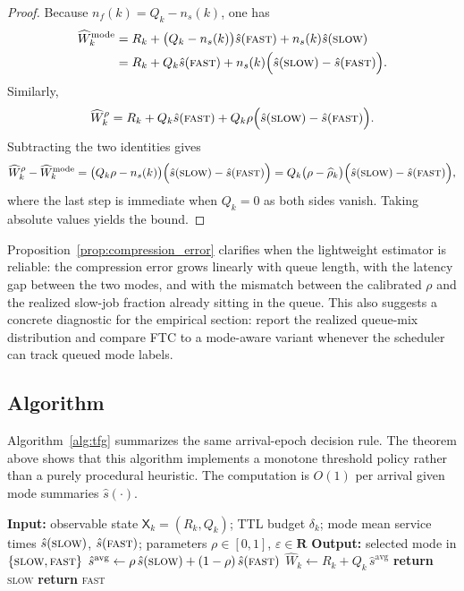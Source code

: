\documentclass[preprint,12pt]{elsarticle}
\begin{document}
\begin{proof}
Because $n_f(k)=Q_k-n_s(k)$, one has
\begin{align*}
\widehat W_k^{\mathrm{mode}}
&= R_k + \bigl(Q_k-n_s(k)\bigr)\hat{s}(\textsc{fast}) + n_s(k)\hat{s}(\textsc{slow}) \\
&= R_k + Q_k\hat{s}(\textsc{fast}) + n_s(k)\Bigl(\hat{s}(\textsc{slow})-\hat{s}(\textsc{fast})\Bigr).
\end{align*}
Similarly,
\[
\widehat W_k^{\rho}
= R_k + Q_k\hat{s}(\textsc{fast}) + Q_k\rho\Bigl(\hat{s}(\textsc{slow})-\hat{s}(\textsc{fast})\Bigr).
\]
Subtracting the two identities gives
\[
\widehat W_k^{\rho} - \widehat W_k^{\mathrm{mode}}
= \bigl(Q_k\rho - n_s(k)\bigr)\Bigl(\hat{s}(\textsc{slow})-\hat{s}(\textsc{fast})\Bigr)
= Q_k\bigl(\rho-\widehat\rho_k\bigr)\Bigl(\hat{s}(\textsc{slow})-\hat{s}(\textsc{fast})\Bigr),
\]
where the last step is immediate when $Q_k=0$ as both sides vanish. Taking absolute values yields the bound.
\end{proof}

Proposition~\ref{prop:compression_error} clarifies when the lightweight estimator is reliable: the compression error grows linearly with queue length, with the latency gap between the two modes, and with the mismatch between the calibrated $\rho$ and the realized slow-job fraction already sitting in the queue. This also suggests a concrete diagnostic for the empirical section: report the realized queue-mix distribution and compare FTC to a mode-aware variant whenever the scheduler can track queued mode labels.

\subsection{Algorithm}
\label{sec:tfg_algorithm}

Algorithm~\ref{alg:tfg} summarizes the same arrival-epoch decision rule. The theorem above shows that this algorithm implements a monotone threshold policy rather than a purely procedural heuristic. The computation is $O(1)$ per arrival given mode summaries $\hat{s}(\cdot)$.

\begin{algorithm}[t]
\caption{FTC (Firm-Deadline Tool Control) at request arrival (defaults: $\rho=0.55$, $\varepsilon=0$).}
\label{alg:tfg}
\begin{algorithmic}[1]
\STATE \textbf{Input:} observable state $\mathsf{X}_k=(R_k,Q_k)$; TTL budget $\delta_k$; mode mean service times $\hat{s}(\textsc{slow})$, $\hat{s}(\textsc{fast})$; parameters $\rho\in[0,1]$, $\varepsilon\in \mathbf{R}$
\STATE \textbf{Output:} selected mode in $\{\textsc{slow},\textsc{fast}\}$
\STATE $\hat{s}^{\mathrm{avg}} \gets \rho\,\hat{s}(\textsc{slow}) + (1-\rho)\,\hat{s}(\textsc{fast})$
\STATE $\widehat{W}_k \gets R_k + Q_k\,\hat{s}^{\mathrm{avg}}$
    \STATE \textbf{return} \textsc{slow}
\ELSE
    \STATE \textbf{return} \textsc{fast}
\ENDIF
\end{algorithmic}
\end{algorithm}
\end{document}
